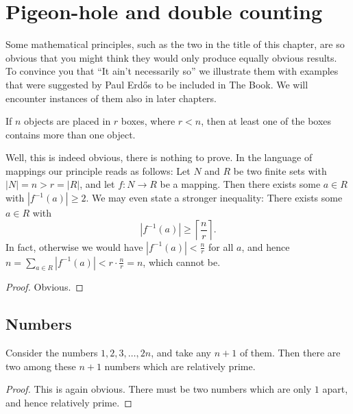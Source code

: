 \chapter{Pigeon-hole and double counting}
\label{chapter28}

Some mathematical principles, such as the two in the title of this chapter,
are so obvious that you might think they would only produce equally
obvious results. To convince you that ``It ain't necessarily so'' we
illustrate them with examples that were suggested by Paul Erd\H{o}s to be
included in The Book. We will encounter instances of them also in later
chapters.

\begin{theorem}
  \label{pigeon_hole_principle}
  If $n$ objects are placed in $r$ boxes, where $r < n$, then at least one of the boxes contains
  more than one object.
\end{theorem}

Well, this is indeed obvious, there is nothing to prove. In the language of
mappings our principle reads as follows: Let $N$ and $R$ be two finite sets
with $|N| = n > r = |R|$, and let $f : N \to R$ be a mapping. Then there
exists some $a \in R$ with $|f^{-1}(a)| \geq 2$. We may even state a stronger
inequality: There exists some $a \in R$ with
\[
|f^{-1}(a)| \geq \left\lceil \frac{n}{r} \right\rceil. \tag{1}
\]
In fact, otherwise we would have $|f^{-1}(a)| < \frac{n}{r}$ for all $a$, and hence
$n = \sum_{a \in R} |f^{-1}(a)| < r \cdot \frac{n}{r} = n$, which cannot be.

\begin{proof}
  \leanok
  Obvious.
\end{proof}

\section{Numbers}

\begin{theorem}[Claim]
  \label{ch28claim1}
  Consider the numbers $1, 2, 3, \dots, 2n$, and take any $n + 1$
  of them. Then there are two among these $n + 1$ numbers which are
  relatively prime.
\end{theorem}
\begin{proof}
  \leanok
  This is again obvious. There must be two numbers which are only $1$ apart,
  and hence relatively prime.
\end{proof}

